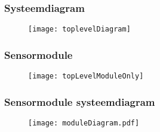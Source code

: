 
\begin{frame}
    \frametitle{Systeemdiagram}

    \begin{figure}
        \centering
        \texttt{[image: toplevelDiagram]}
    \end{figure}

\end{frame}

\begin{frame}
    \frametitle{Sensormodule}

    \begin{figure}
        \centering
        \texttt{[image: topLevelModuleOnly]}
    \end{figure}

\end{frame}



\begin{frame}
    \frametitle{Sensormodule systeemdiagram}
    
    \begin{figure}
        \centering
        \texttt{[image: moduleDiagram.pdf]}
    \end{figure}
    
\end{frame}